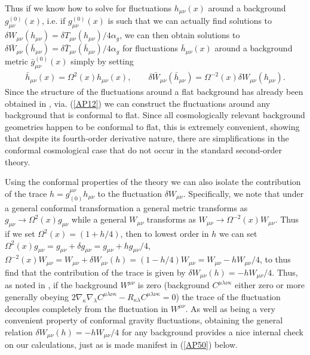 \documentclass[aps]{revtex4}
\begin{document}
%
Thus if we know how to solve for fluctuations $h_{\mu\nu}(x)$ around a background $g^{(0)}_{\mu\nu}(x)$, i.e. if $g^{(0)}_{\mu\nu}(x)$ is such that we can actually find solutions to $\delta W_{\mu\nu}(h_{\mu\nu})=\delta T_{\mu\nu}(h_{\mu\nu})/4\alpha_g$, we can then obtain solutions to  $\delta \bar{W}_{\mu\nu}(\bar{h}_{\mu\nu})=\delta \bar{T}_{\mu\nu}(\bar{h}_{\mu\nu})/4\alpha_g$  for fluctuations $\bar{h}_{\mu\nu}(x)$ around a background metric $\bar{g}^{(0)}_{\mu\nu}(x)$ simply by setting 
%
\begin{eqnarray}
\bar{h}_{\mu\nu}(x)=\Omega^2(x)h_{\mu\nu}(x),\qquad \delta \bar{W}_{\mu\nu}(\bar{h}_{\mu\nu})=\Omega^{-2}(x)\delta W_{\mu\nu}(h_{\mu\nu}).
\label{AP12}
\end{eqnarray}
%
Since the structure of the fluctuations around a flat background has already been obtained in \cite{Mannheim2006}, via. (\ref{AP12}) we can construct the fluctuations around any background that is conformal to flat. Since all cosmologically relevant background geometries happen to be conformal to flat, this is extremely convenient, showing that despite its fourth-order derivative nature, there are simplifications in the conformal cosmological case that do not occur in the standard second-order theory. 

Using the conformal properties of the theory we can also isolate the contribution of the trace $h=g_{(0)}^{\mu\nu}h_{\mu\nu}$ to the fluctuation $\delta W_{\mu\nu}$. Specifically, we note that under a general conformal transformation a  general metric transforms as $g_{\mu\nu}\rightarrow \Omega^2(x)g_{\mu\nu}$ while a general $W_{\mu\nu}$ transforms as $W_{\mu\nu}\rightarrow \Omega^{-2}(x)W_{\mu\nu}$. Thus if we set $\Omega^2(x)=(1+h/4)$, then to lowest order in $h$ we can set  $\Omega^2(x)g_{\mu\nu}=g_{\mu\nu}+\delta g_{\mu\nu}=g_{\mu\nu}+hg_{\mu\nu}/4$, $\Omega^{-2}(x)W_{\mu\nu}=W_{\mu\nu}+\delta W_{\mu\nu}(h)=(1-h/4)W_{\mu\nu}=
W_{\mu\nu}-hW_{\mu\nu}/4$, to thus find that the contribution  of the trace is given by  $\delta W_{\mu\nu}(h)= -hW_{\mu\nu}/4$. Thus, as noted in \cite{Mannheim2012a}, if the background $W^{\mu\nu}$ is zero (background $C^{\mu\lambda\nu\kappa}$ either zero or more generally obeying $2\nabla_{\kappa}\nabla_{\lambda}C^{\mu\lambda\nu\kappa}-R_{\kappa\lambda}C^{\mu\lambda\nu\kappa}=0$) the trace  of the fluctuation decouples completely from the fluctuation in $W^{\mu\nu}$. As well as being a very convenient property of conformal gravity fluctuations, obtaining the general relation $\delta W_{\mu\nu}(h)= -hW_{\mu\nu}/4$ for any background provides a nice internal check on our calculations, just as is made manifest  in (\ref{AP50}) below.
\end{document}
